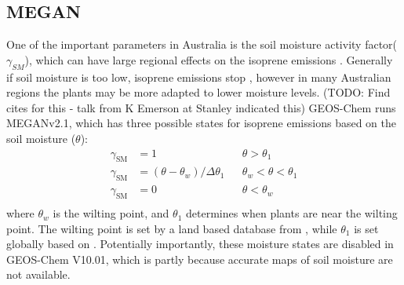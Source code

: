   \subsection{MEGAN}

    One of the important parameters in Australia is the soil moisture activity factor($\gamma_{SM}$), which can have large regional effects on the isoprene emissions \parencite{Sindelarova2014,Bauwens2016}.
    Generally if soil moisture is too low, isoprene emissions stop \parencite{Pegoraro2004,Niinemets2010}, however in many Australian regions the plants may be more adapted to lower moisture levels. (TODO: Find cites for this - talk from K Emerson at Stanley indicated this)
    GEOS-Chem runs MEGANv2.1, which has three possible states for isoprene emissions based on the soil moisture ($\theta$):
    \begin{align*}
    \gamma_\mathrm{SM} & = 1 && \theta > \theta_1 \\
    \gamma_\mathrm{SM} & = (\theta-\theta_w)/\Delta\theta_1  && \theta_w < \theta < \theta_1 \\
    \gamma_\mathrm{SM} & = 0 && \theta < \theta_w \\
    \end{align*}
    where $\theta_w$ is the wilting point, and $\theta_1$ determines when plants are near the wilting point.
    The wilting point is set by a land based database from \textcite{Chen2001}, while $\theta_1$ is set globally based on \textcite{Pegoraro2004}.
    Potentially importantly, these moisture states are disabled in GEOS-Chem V10.01, which is partly because accurate maps of soil moisture are not available.
  
%  
  